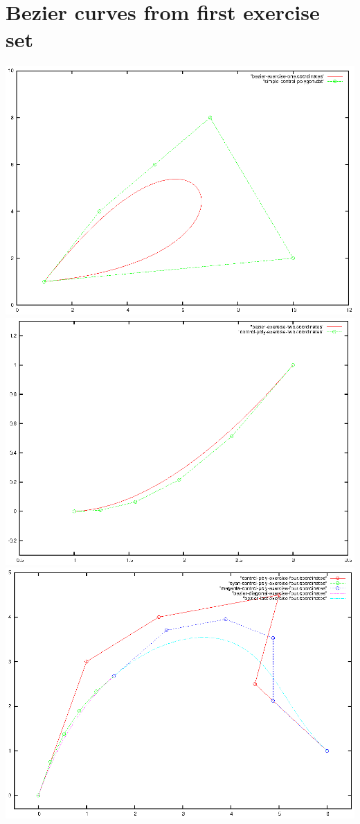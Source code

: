 \documentclass{article}
\begin{document}
\section{Bezier curves from first exercise set}
\includegraphics{bezier-deCasteljau-curves/exercise-one}
\includegraphics{bezier-deCasteljau-curves/exercise-two}
\includegraphics{bezier-deCasteljau-curves/exercise-four}
\end{document}
